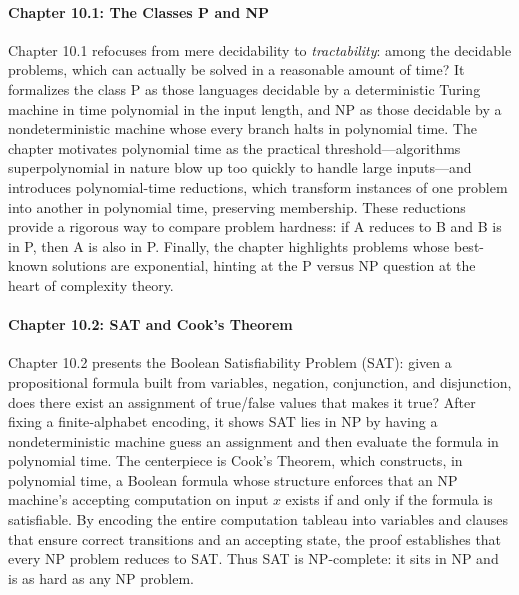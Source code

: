 \documentclass{article}
\theoremstyle{theorem}
\theoremstyle{definition}
\theoremstyle{remark}
\begin{document}
\paragraph*{Chapter 10.1: The Classes P and NP}
Chapter 10.1 refocuses from mere decidability to \emph{tractability}: among the decidable problems, which can actually be solved in a reasonable amount of time? It formalizes the class P as those languages decidable by a deterministic Turing machine in time polynomial in the input length, and NP as those decidable by a nondeterministic machine whose every branch halts in polynomial time. The chapter motivates polynomial time as the practical threshold—algorithms superpolynomial in nature blow up too quickly to handle large inputs—and introduces polynomial-time reductions, which transform instances of one problem into another in polynomial time, preserving membership. These reductions provide a rigorous way to compare problem hardness: if A reduces to B and B is in P, then A is also in P. Finally, the chapter highlights problems whose best-known solutions are exponential, hinting at the P versus NP question at the heart of complexity theory.

\paragraph*{Chapter 10.2: SAT and Cook’s Theorem}
Chapter 10.2 presents the Boolean Satisfiability Problem (SAT): given a propositional formula built from variables, negation, conjunction, and disjunction, does there exist an assignment of true/false values that makes it true? After fixing a finite‐alphabet encoding, it shows SAT lies in NP by having a nondeterministic machine guess an assignment and then evaluate the formula in polynomial time. The centerpiece is Cook’s Theorem, which constructs, in polynomial time, a Boolean formula whose structure enforces that an NP machine’s accepting computation on input \(x\) exists if and only if the formula is satisfiable. By encoding the entire computation tableau into variables and clauses that ensure correct transitions and an accepting state, the proof establishes that every NP problem reduces to SAT. Thus SAT is NP-complete: it sits in NP and is as hard as any NP problem.
\end{document}
